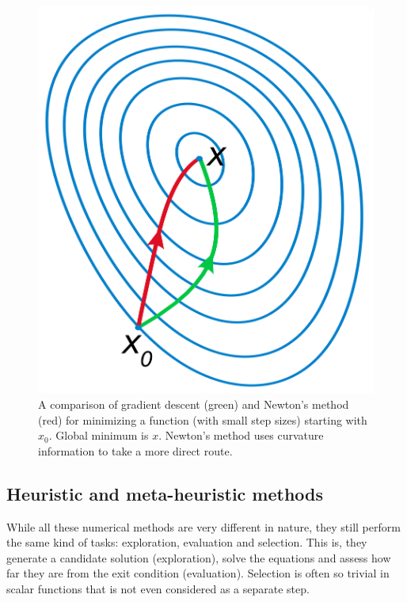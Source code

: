 \begin{figure}[H]
	\includegraphics[width=\textwidth]{./figures/04/gradientdescent.png}
	\caption[Gradient descent vs Newton's optimization]{A comparison of gradient descent (green) and Newton's method (red) for minimizing a function (with small step sizes) starting with $ x_{0} $. Global minimum is $ x $. Newton's method uses curvature information to take a more direct route.}
	\label{fig:gradientdescent}
\end{figure}

\subsection{Heuristic and meta-heuristic methods}
While all these numerical methods are very different in nature, they still perform the same kind of tasks: exploration, evaluation and selection. This is, they generate a candidate solution (exploration), solve the equations and assess how far they are from the exit condition (evaluation). Selection is often so trivial in scalar functions that is not even considered as a separate step.

